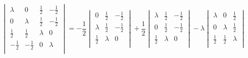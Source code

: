 \documentclass[12pt]{article}
\begin{document}
$$
\begin{vmatrix}
	\lambda & 0 & \frac{1}{2} & -\frac{1}{2} \\
	0 & \lambda & \frac{1}{2} & -\frac{1}{2} \\
	\frac{1}{2} & \frac{1}{2} & \lambda & 0 \\
	-\frac{1}{2} & -\frac{1}{2} & 0 & \lambda \\
\end{vmatrix}
=
-\frac{1}{2}
\begin{vmatrix}
	0 & \frac{1}{2} & -\frac{1}{2} \\
	\lambda & \frac{1}{2} & -\frac{1}{2} \\
	\frac{1}{2} & \lambda & 0 \\
\end{vmatrix}
+\frac{1}{2}
\begin{vmatrix}
	\lambda & \frac{1}{2} & -\frac{1}{2} \\
	0 & \frac{1}{2} & -\frac{1}{2} \\
	\frac{1}{2} & \lambda & 0 \\
\end{vmatrix}
-\lambda
\begin{vmatrix}
	\lambda & 0 & \frac{1}{2} \\
	0 & \lambda & \frac{1}{2} \\
	\frac{1}{2} & \frac{1}{2} & \lambda \\
\end{vmatrix}
$$
\end{document}

